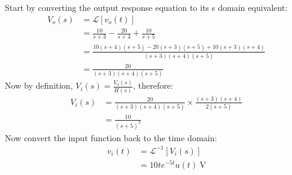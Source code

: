 Start by converting the output response equation to its s domain equivalent:
\begin{align*}
	V_o(s) &= \mathcal{L}[v_o(t)] \\
	&= \frac{10}{s+3} - \frac{20}{s+4} + \frac{10}{s+5} \\
	&= \frac{10(s+4)(s+5) - 20(s+3)(s+5) + 10(s+3)(s+4)}{(s+3)(s+4)(s+5)} \\
	&= \frac{20}{(s+3)(s+4)(s+5)}
\end{align*}
Now by definition, $V_i(s) = \frac{V_o(s)}{H(s)}$, therefore:
\begin{align*}
	V_i(s) &= \frac{20}{(s+3)(s+4)(s+5)} \times \frac{(s+3)(s+4)}{2(s+5)} \\
	&= \frac{10}{(s+5)^2}
\end{align*}
Now convert the input function back to the time domain:
\begin{align*}
	v_i(t) &= \mathcal{L}^{-1}[V_i(s)] \\
	&= 10te^{-5t} u(t) \ \mathrm{V}
	\\
\end{align*}
